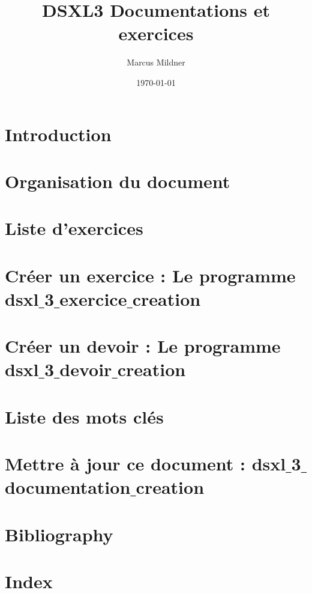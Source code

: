 \documentclass{book}
\title{DSXL3 Documentations et exercices}
\author{Marcus Mildner}
\date{\today}
\begin{document}
\maketitle
\frontmatter
\chapter{Introduction}


\newpage
\tableofcontents
\listoffigures
\listoftables
\mainmatter
\chapter{Organisation du document}



\chapter{Liste d'exercices}


\chapter{Créer un exercice : Le programme dsxl$\_$3$\_$exercice$\_$creation}


\chapter{Créer un devoir : Le programme dsxl$\_$3$\_$devoir$\_$creation}




\appendix
\chapter{Liste des mots clés}


\chapter{Mettre à jour ce document : dsxl$\_$3$\_$documentation$\_$creation}

\backmatter
\chapter{Bibliography}
\chapter{Index}
\printindex[notions]

\printindex[dsxlindex]
\end{document}
